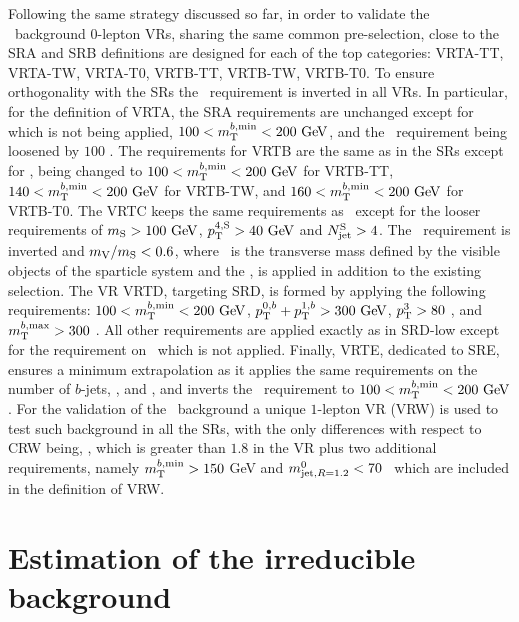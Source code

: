 			Following the same strategy discussed so far, in order to validate the \ttbar\ background $0$-lepton \acp{VR}, sharing the same common pre-selection, close to the SRA and SRB definitions are designed for each of the top categories: VRTA-TT, VRTA-TW, VRTA-T0, VRTB-TT, VRTB-TW, VRTB-T0. To ensure orthogonality with the \acp{SR} the \mtbmin\ requirement is inverted in all \acp{VR}. In particular, for the definition of VRTA, the SRA requirements are unchanged except for \mttwo\, which is not being applied, $100<\mtbmin<200\gev$, and the \met\ requirement being loosened by $100$ \GeV. The requirements for VRTB are the same as in the \acp{SR} except for \mtbmin, being changed to $100<\mtbmin<200\gev$ for VRTB-TT, $140<\mtbmin<200\gev$ for VRTB-TW, and $160<\mtbmin<200\gev$ for VRTB-T0. The VRTC keeps the same requirements as \SRC\ except for the looser requirements of $\mS> 100\gev$, $\pTSFour>40\gev$ and $N_{\mathrm{jet}}^{\mathrm{S}} > 4$. The \dPhiISRMET\ requirement is inverted and $m_{\mathrm{V}}/m_{\mathrm{S}}<0.6$, where \mV\ is the transverse mass defined by the visible objects of the sparticle system and the \met, is applied in addition to the existing selection. The \ac{VR} VRTD, targeting SRD, is formed by applying the following requirements: $100<\mtbmin<200\gev$, $\ptbzero+\ptbone>300\gev$, $p_{\mathrm{T}}^{3}>80$ \GeV, and $m_{\mathrm{T}}^{b,\mathrm{max}}>300$ \GeV. All other requirements are applied exactly as in SRD-low except for the requirement on \ptfour\ which is not applied. Finally, VRTE, dedicated to SRE, ensures a minimum extrapolation as it applies the same requirements on the number of $b$-jets, \mantikteightzero, and \mantikteightone, and inverts the \mtbmin\ requirement to $100<\mtbmin<200\gev$. For the validation of the \Wjets\ background a unique $1$-lepton \ac{VR} (VRW) is used to test such background in all the \acp{SR}, with the only differences with respect to CRW being, \mindrblep, which is greater than $1.8$ in the \ac{VR} plus two additional requirements, namely $m_{\mathrm{T}}^{b,\mathrm{min}}>150$ GeV and $m^{0}_{\mathrm{jet,}R=1.2}<70$ \GeV\ which are included in the definition of VRW.




	\section{Estimation of the irreducible background}
	\label{sec:ddbkgest}

